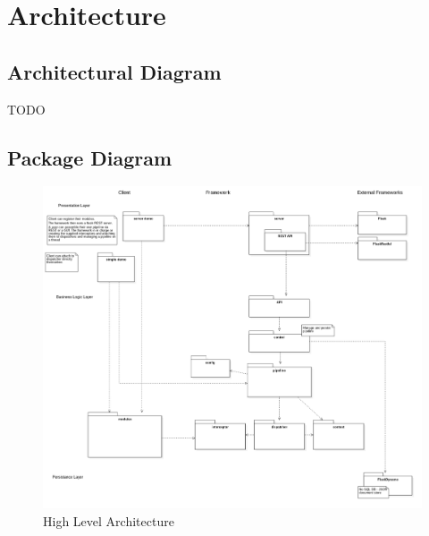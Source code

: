 \chapter{Architecture}

  \section{Architectural Diagram}
  TODO

  \section{Package Diagram}
    \begin{figure}[H]
        \includegraphics[width = 1.2\linewidth]{diagrams/architecture.png}
        \caption{High Level Architecture}
        \label{fig:high_level_architecture}
      \end{figure}

